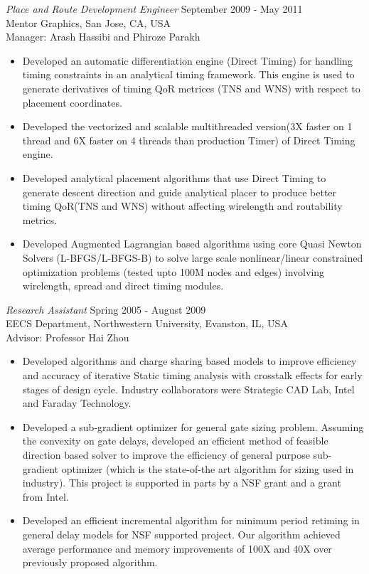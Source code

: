 \documentclass[margin]{res}
\begin{document}
\begin{resume}
{\sl Place and Route Development Engineer} \hfill September 2009 - May 2011\\
Mentor Graphics, San Jose, CA, USA\\
Manager: Arash Hassibi and Phiroze Parakh
\begin{itemize} \itemsep -2pt
\item Developed an automatic differentiation engine (Direct Timing) for handling timing constraints in an analytical
timing framework. This engine is used to generate derivatives of timing QoR metrices (TNS and WNS) with respect to placement coordinates.
\item Developed the vectorized and scalable multithreaded version(3X faster on 1 thread and 6X faster on 4 threads than production Timer) of Direct Timing engine. 
\item Developed analytical placement algorithms that use Direct Timing to generate descent direction and guide analytical placer to produce better timing QoR(TNS and WNS) 
without affecting wirelength and routability metrics.
\item Developed Augmented Lagrangian based algorithms using core Quasi Newton Solvers (L-BFGS/L-BFGS-B) to solve large scale nonlinear/linear constrained 
optimization problems (tested upto 100M nodes and edges) involving wirelength, spread and direct timing modules. 
\end{itemize}

{\sl Research Assistant} \hfill Spring 2005 - August 2009\\
EECS Department, Northwestern University, Evanston, IL, USA\\
Advisor: Professor Hai Zhou
\begin{itemize} \itemsep -2pt
\item Developed algorithms and charge sharing based models to improve efficiency and accuracy of
  iterative Static timing analysis with crosstalk effects for early stages of design cycle. 
  Industry collaborators were Strategic CAD Lab, Intel and Faraday Technology.
\item Developed a sub-gradient optimizer for general gate sizing problem. Assuming the convexity
  on gate delays, developed an efficient method of feasible direction based solver to improve the 
  efficiency of general purpose sub-gradient optimizer (which is the state-of-the art algorithm for 
  sizing used in industry). This project is supported in parts by a NSF grant and a grant from 
  Intel. 
\item Developed an efficient incremental algorithm for minimum period retiming
  in general delay models for NSF supported project. Our algorithm achieved average 
  performance and memory improvements of 100X and 40X over previously proposed algorithm.
\end{itemize}


\end{resume}
\end{document}
